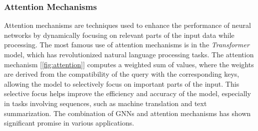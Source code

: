 \documentclass[../Thesis.tex]{subfiles}
\begin{document}
\subsubsection{Attention Mechanisms}
Attention mechanisms are techniques used to enhance the performance of neural networks by dynamically focusing on relevant parts of the input data while processing. The most famous use of attention mechanisms is in the \emph{Transformer} model, which has revolutionized natural language processing tasks. The attention mechanism [\autoref{fig:attention}] computes a weighted sum of values, where the weights are derived from the compatibility of the query with the corresponding keys, allowing the model to selectively focus on important parts of the input. This selective focus helps improve the efficiency and accuracy of the model, especially in tasks involving sequences, such as machine translation and text summarization.  
The combination of GNNs and attention mechanisms has shown significant promise in various applications.

\end{document}
